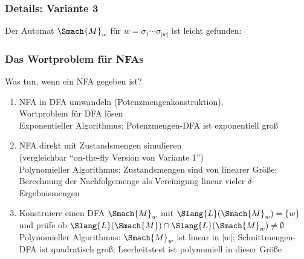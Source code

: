\documentclass[aspectratio=1610,onlymath]{beamer}
\begin{document}
\begin{frame}\frametitle{Details: Variante 3}

Der Automat $\Smach{M}_w$ für $w=\sigma_1\cdots\sigma_{|w|}$ ist leicht gefunden:
\bigskip

\bigskip


\end{frame}

\begin{frame}\frametitle{Das Wortproblem für NFAs}

Was tun, wenn ein NFA gegeben ist?
\begin{enumerate}[{Variante} 1:]
\item \alert{NFA in DFA umwandeln (Potenzmengenkonstruktion),\\ Wortproblem für DFA lösen}\\
	Exponentieller Algorithmus: Potenzmengen-DFA ist exponentiell groß
\item \alert{NFA direkt mit Zustandsmengen simulieren\\ (vergleichbar "`on-the-fly Version von Variante 1"')}\\
	Polynomieller Algorithmus: Zustandsmengen sind von linearer Größe; Berechnung der Nachfolgemenge als
	Vereinigung linear vieler $\delta$-Ergebnismengen
\item \alert{Konstruiere einen DFA $\Smach{M}_w$ mit $\Slang{L}(\Smach{M}_w)=\{w\}$ und prüfe ob
$\Slang{L}(\Smach{M})\cap \Slang{L}(\Smach{M}_w) \neq\emptyset$}\\
	Polynomieller Algorithmus: $\Smach{M}_w$ ist linear in $|w|$; Schnittmengen-DFA ist quadratisch groß;
	Leerheitstest ist polynomiell in dieser Größe
\end{enumerate}

\end{frame}
\end{document}
